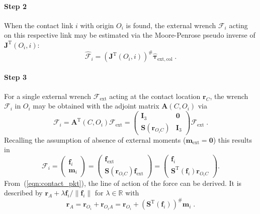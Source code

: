 \paragraph{Step 2}

When the contact link $i$ with origin $O_i$ is found, the external wrench $\bm{\mathcal{F}}_i$ acting on this respective link may be estimated via the Moore-Penrose pseudo inverse of $\bm{J}^\mathrm{T}(O_i,i)$:
%
\begin{equation}
\hat{\bm{\mathcal{F}}}_i=(\bm{J}^\mathrm{T}(O_i,i))^\#\hat{\bm{\tau}}_\mathrm{ext,col}\;.\label{eqn:F_i}
\end{equation}
%
\paragraph{Step 3}
\label{sec:isolation_step3}
For a single external wrench $\bm{\mathcal{F}}_\mathrm{ext}$ acting at the contact location $\bm{r}_C$, the wrench $\bm{\mathcal{F}}_i$ in $O_i$ may be obtained with the adjoint matrix $\bm{A}(C,O_i)$ via
%
\begin{equation}
\bm{\mathcal{F}}_i=\bm{A}^\mathrm{T}(C,O_i)\bm{\mathcal{F}}_\mathrm{ext}
=\begin{pmatrix} \bm{I}_3 & \bm{0}\\
\bm{S}(\bm{r}_{O_iC}) & \bm{I}_3\end{pmatrix}
\bm{\mathcal{F}}_\mathrm{ext}\;.\label{eqn:ext_wrench_i}
\end{equation}
%
Recalling the assumption of absence of external moments ($\bm{m}_\mathrm{ext}=\bm{0}$) this results in
%
\begin{equation}
\bm{\mathcal{F}}_i=\begin{pmatrix} \bm{f}_i\\\bm{m}_i\end{pmatrix}
=\begin{pmatrix}
\bm{f}_\mathrm{ext}\\\bm{S}(\bm{r}_{O_iC})\bm{f}_\mathrm{ext}
\end{pmatrix}=\begin{pmatrix}
\bm{f}_i\\\bm{S}^\mathrm{T}(\bm{f}_i)\bm{r}_{O_iC}
\end{pmatrix}.\label{eqn:contact_pkt}
\end{equation}
%
From~(\ref{eqn:contact_pkt}), the line of action of the force can be derived.
It is described by $\bm{r}_{A}+\lambda\bm{f}_i/\|\bm{f}_i\|$ for $\lambda\in\mathbb{R}$ with
%
\begin{equation}
\bm{r}_A=\bm{r}_{O_i}+\bm{r}_{O_iA}=\bm{r}_{O_i}+\left(\bm{S}^\mathrm{T}(\bm{f}_i)\right)^\#\bm{m}_i\;.
\label{equ:force_loa_point}
\end{equation}
%

